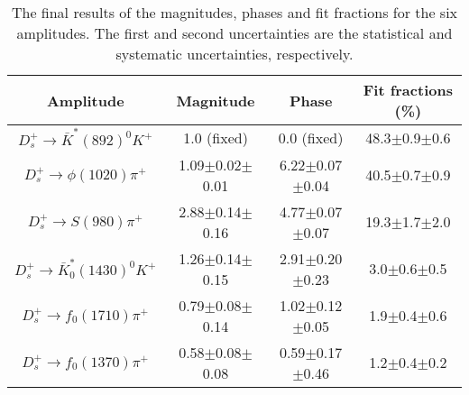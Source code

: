 {    \begin{table}[htbp]
        \caption{The final results of the magnitudes, phases and fit fractions for the six amplitudes. The first and second uncertainties are the statistical and systematic uncertainties, respectively.}
        \label{final-result}
        \begin{center}
            \begin{tabular}{cccc}
                \toprule\toprule
                Amplitude & Magnitude  & Phase  & Fit fractions (\%)\\
                \hline
                $D_{s}^{+} \rightarrow \bar{K}^{*}(892)^{0}K^{+}$              & 1.0 (fixed)             & 0.0 (fixed)                & 48.3$\pm$0.9$\pm$0.6\\
                $D_{s}^{+} \rightarrow \phi(1020)\pi^{+}$                      & 1.09$\pm$0.02$\pm$0.01 & 6.22$\pm$0.07$\pm$0.04    & 40.5$\pm$0.7$\pm$0.9\\
                $D_{s}^{+} \rightarrow S(980)\pi^{+}$                          & 2.88$\pm$0.14$\pm$0.16 & 4.77$\pm$0.07$\pm$0.07    & 19.3$\pm$1.7$\pm$2.0\\
                $D_{s}^{+} \rightarrow \bar{K}^{*}_{0}(1430)^{0}K^{+}$         & 1.26$\pm$0.14$\pm$0.15 & 2.91$\pm$0.20$\pm$0.23    & 3.0$\pm$0.6$\pm$0.5\\
                $D_{s}^{+} \rightarrow f_{0}(1710)\pi^{+}$                     & 0.79$\pm$0.08$\pm$0.14 & 1.02$\pm$0.12$\pm$0.05    & 1.9$\pm$0.4$\pm$0.6\\
                $D_{s}^{+} \rightarrow f_{0}(1370)\pi^{+}$                     & 0.58$\pm$0.08$\pm$0.08 & 0.59$\pm$0.17$\pm$0.46    & 1.2$\pm$0.4$\pm$0.2\\
                \bottomrule\bottomrule
            \end{tabular}
        \end{center}
    \end{table}
}
